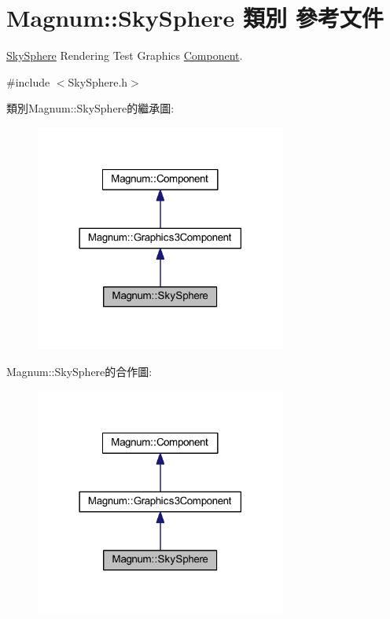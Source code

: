 \hypertarget{class_magnum_1_1_sky_sphere}{}\section{Magnum\+:\+:Sky\+Sphere 類別 參考文件}
\label{class_magnum_1_1_sky_sphere}


\hyperlink{class_magnum_1_1_sky_sphere}{Sky\+Sphere} Rendering Test Graphics \hyperlink{class_magnum_1_1_component}{Component}.  




{\ttfamily \#include $<$Sky\+Sphere.\+h$>$}



類別\+Magnum\+:\+:Sky\+Sphere的繼承圖\+:\nopagebreak
\begin{figure}[H]
\begin{center}
\leavevmode
\includegraphics[width=234pt]{class_magnum_1_1_sky_sphere__inherit__graph}
\end{center}
\end{figure}


Magnum\+:\+:Sky\+Sphere的合作圖\+:\nopagebreak
\begin{figure}[H]
\begin{center}
\leavevmode
\includegraphics[width=234pt]{class_magnum_1_1_sky_sphere__coll__graph}
\end{center}
\end{figure}
